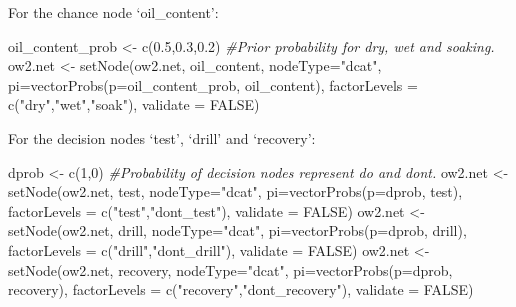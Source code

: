 \documentclass[
]{article}
\newenvironment{Shaded}{\begin{snugshade}}{\end{snugshade}}
\newcommand{\AttributeTok}[1]{\textcolor[rgb]{0.77,0.63,0.00}{#1}}
\newcommand{\CommentTok}[1]{\textcolor[rgb]{0.56,0.35,0.01}{\textit{#1}}}
\newcommand{\ConstantTok}[1]{\textcolor[rgb]{0.00,0.00,0.00}{#1}}
\newcommand{\DecValTok}[1]{\textcolor[rgb]{0.00,0.00,0.81}{#1}}
\newcommand{\FloatTok}[1]{\textcolor[rgb]{0.00,0.00,0.81}{#1}}
\newcommand{\FunctionTok}[1]{\textcolor[rgb]{0.00,0.00,0.00}{#1}}
\newcommand{\NormalTok}[1]{#1}
\newcommand{\OtherTok}[1]{\textcolor[rgb]{0.56,0.35,0.01}{#1}}
\newcommand{\StringTok}[1]{\textcolor[rgb]{0.31,0.60,0.02}{#1}}
\begin{document}
For the chance node `oil\_content':

\begin{Shaded}
\begin{Highlighting}[]
\NormalTok{oil\_content\_prob }\OtherTok{\textless{}{-}} \FunctionTok{c}\NormalTok{(}\FloatTok{0.5}\NormalTok{,}\FloatTok{0.3}\NormalTok{,}\FloatTok{0.2}\NormalTok{) }\CommentTok{\#Prior probability for dry, wet and soaking.}
\NormalTok{ow2.net }\OtherTok{\textless{}{-}} \FunctionTok{setNode}\NormalTok{(ow2.net, oil\_content, }\AttributeTok{nodeType=}\StringTok{"dcat"}\NormalTok{, }\AttributeTok{pi=}\FunctionTok{vectorProbs}\NormalTok{(}\AttributeTok{p=}\NormalTok{oil\_content\_prob, oil\_content), }\AttributeTok{factorLevels =} \FunctionTok{c}\NormalTok{(}\StringTok{"dry"}\NormalTok{,}\StringTok{"wet"}\NormalTok{,}\StringTok{"soak"}\NormalTok{), }\AttributeTok{validate =} \ConstantTok{FALSE}\NormalTok{)}
\end{Highlighting}
\end{Shaded}

For the decision nodes `test', `drill' and `recovery':

\begin{Shaded}
\begin{Highlighting}[]
\NormalTok{dprob }\OtherTok{\textless{}{-}} \FunctionTok{c}\NormalTok{(}\DecValTok{1}\NormalTok{,}\DecValTok{0}\NormalTok{) }\CommentTok{\#Probability of decision nodes represent do and don\textquotesingle{}t.}
\NormalTok{ow2.net }\OtherTok{\textless{}{-}} \FunctionTok{setNode}\NormalTok{(ow2.net, test, }\AttributeTok{nodeType=}\StringTok{"dcat"}\NormalTok{, }\AttributeTok{pi=}\FunctionTok{vectorProbs}\NormalTok{(}\AttributeTok{p=}\NormalTok{dprob, test), }\AttributeTok{factorLevels =} \FunctionTok{c}\NormalTok{(}\StringTok{"test"}\NormalTok{,}\StringTok{"dont\_test"}\NormalTok{), }\AttributeTok{validate =} \ConstantTok{FALSE}\NormalTok{)}
\NormalTok{ow2.net }\OtherTok{\textless{}{-}} \FunctionTok{setNode}\NormalTok{(ow2.net, drill, }\AttributeTok{nodeType=}\StringTok{"dcat"}\NormalTok{, }\AttributeTok{pi=}\FunctionTok{vectorProbs}\NormalTok{(}\AttributeTok{p=}\NormalTok{dprob, drill), }\AttributeTok{factorLevels =} \FunctionTok{c}\NormalTok{(}\StringTok{"drill"}\NormalTok{,}\StringTok{"dont\_drill"}\NormalTok{), }\AttributeTok{validate =} \ConstantTok{FALSE}\NormalTok{)}
\NormalTok{ow2.net }\OtherTok{\textless{}{-}} \FunctionTok{setNode}\NormalTok{(ow2.net, recovery, }\AttributeTok{nodeType=}\StringTok{"dcat"}\NormalTok{, }\AttributeTok{pi=}\FunctionTok{vectorProbs}\NormalTok{(}\AttributeTok{p=}\NormalTok{dprob, recovery), }\AttributeTok{factorLevels =} \FunctionTok{c}\NormalTok{(}\StringTok{"recovery"}\NormalTok{,}\StringTok{"dont\_recovery"}\NormalTok{), }\AttributeTok{validate =} \ConstantTok{FALSE}\NormalTok{)}
\end{Highlighting}
\end{Shaded}
\end{document}
